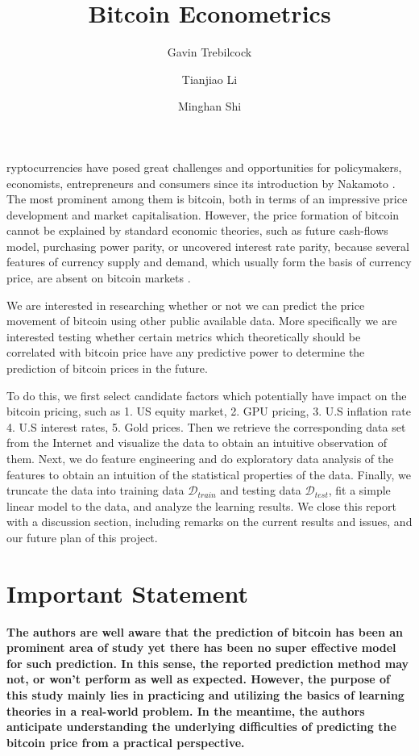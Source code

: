 \documentclass[9pt,twocolumn,twoside]{ilcss}
\title{Bitcoin Econometrics}
\author[a]{Gavin Trebilcock}
\author[b]{Tianjiao Li}
\author[c]{Minghan Shi}
\affil[a]{gt322, Computer Science}
\affil[b]{tl787, Mechanical Engineering}
\affil[c]{ms3536, Electrical and Computer Engineering}
\begin{document}
\maketitle
\thispagestyle{firststyle}


ryptocurrencies have posed great challenges and opportunities for  policymakers, economists, entrepreneurs and consumers since its introduction by Nakamoto \cite{Dyhrberg2016}. The most prominent among them is bitcoin, both in terms of an impressive price development and market capitalisation. However, the price formation of bitcoin cannot be explained by standard economic theories, such as future cash-flows model, purchasing power parity, or uncovered interest rate parity, because several features of currency supply and demand, which usually form the basis of currency price, are absent on bitcoin markets \cite{Ciaian2016}.

We are interested in researching whether or not we can predict the price movement of bitcoin using other public available data. More specifically we are interested testing whether certain metrics which theoretically should be correlated with bitcoin price have any predictive power to determine the prediction of bitcoin prices in the future. 

To do this, we first select candidate factors which potentially have impact on the bitcoin pricing, such as 1. US equity market, 2. GPU pricing, 3. U.S inflation rate 4. U.S interest rates, 5. Gold prices. Then we retrieve the corresponding data set from the Internet and visualize the data to obtain an intuitive observation of them. Next, we do feature engineering and do exploratory data analysis of the features to obtain an intuition of the statistical properties of the data. Finally, we truncate the data into training data $\mathcal{D}_{train}$ and testing data $\mathcal{D}_{test}$, fit a simple linear model to the data, and analyze the learning results. We close this report with a discussion section, including remarks on the current results and issues, and our future plan of this project.

\section*{Important Statement}
\textbf{The authors are well aware that the prediction of bitcoin has been an prominent area of study yet there has been no super effective model for such prediction. In this sense, the reported prediction method may not, or won't perform as well as expected. However, the purpose of this study mainly lies in practicing and utilizing the basics of learning theories in a real-world problem. In the meantime, the authors anticipate understanding the underlying difficulties of predicting the bitcoin price from a practical perspective.}
\end{document}
